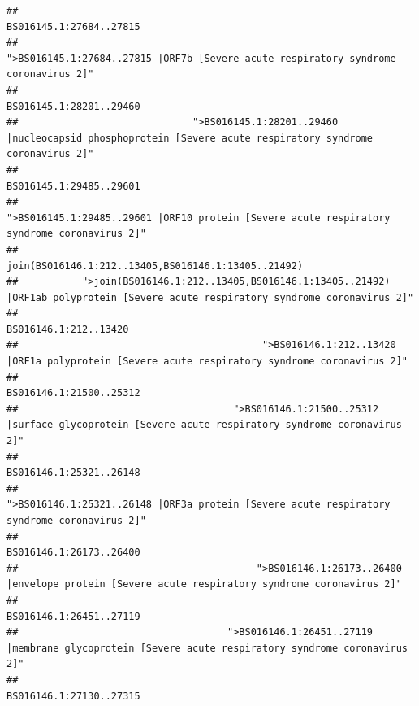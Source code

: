 \documentclass[
]{article}
\begin{document}
\begin{verbatim}
##                                                                                                                BS016145.1:27684..27815 
##                                                    ">BS016145.1:27684..27815 |ORF7b [Severe acute respiratory syndrome coronavirus 2]" 
##                                                                                                                BS016145.1:28201..29460 
##                              ">BS016145.1:28201..29460 |nucleocapsid phosphoprotein [Severe acute respiratory syndrome coronavirus 2]" 
##                                                                                                                BS016145.1:29485..29601 
##                                            ">BS016145.1:29485..29601 |ORF10 protein [Severe acute respiratory syndrome coronavirus 2]" 
##                                                                                    join(BS016146.1:212..13405,BS016146.1:13405..21492) 
##           ">join(BS016146.1:212..13405,BS016146.1:13405..21492) |ORF1ab polyprotein [Severe acute respiratory syndrome coronavirus 2]" 
##                                                                                                                  BS016146.1:212..13420 
##                                          ">BS016146.1:212..13420 |ORF1a polyprotein [Severe acute respiratory syndrome coronavirus 2]" 
##                                                                                                                BS016146.1:21500..25312 
##                                     ">BS016146.1:21500..25312 |surface glycoprotein [Severe acute respiratory syndrome coronavirus 2]" 
##                                                                                                                BS016146.1:25321..26148 
##                                            ">BS016146.1:25321..26148 |ORF3a protein [Severe acute respiratory syndrome coronavirus 2]" 
##                                                                                                                BS016146.1:26173..26400 
##                                         ">BS016146.1:26173..26400 |envelope protein [Severe acute respiratory syndrome coronavirus 2]" 
##                                                                                                                BS016146.1:26451..27119 
##                                    ">BS016146.1:26451..27119 |membrane glycoprotein [Severe acute respiratory syndrome coronavirus 2]" 
##                                                                                                                BS016146.1:27130..27315 

\end{verbatim}
\end{document}
